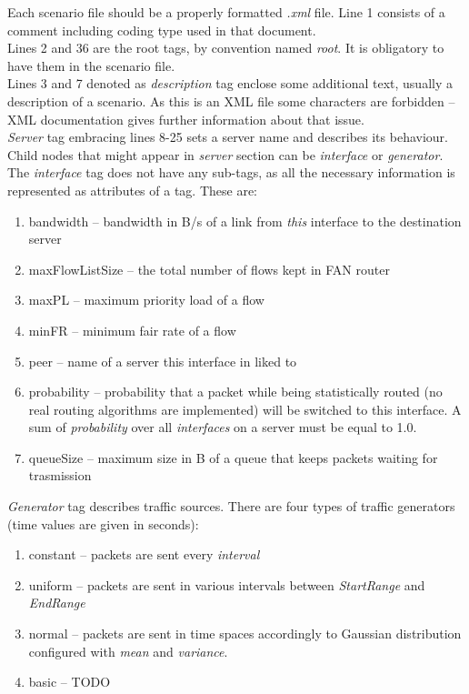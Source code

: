 \documentclass[a4paper,12pt]{article}
\begin{document}
	Each scenario file should be a properly formatted \emph{.xml} file. Line 1
	consists of a comment including coding type used in that document.\\
	Lines 2 and 36 are the root tags, by convention named \emph{root}. It is
	obligatory to have them in the scenario file.\\
	Lines 3 and 7 denoted as \emph{description} tag enclose some
	additional text, usually a description of a scenario. As this is an XML file
	some characters are forbidden -- XML documentation gives further
	information about that issue.\\
	\emph{Server} tag embracing lines 8-25 sets a server name and describes its
	behaviour. Child nodes that might appear in \emph{server} section can be
	\emph{interface} or \emph{generator}.\\
	The \emph{interface} tag does not have any sub-tags, as all the necessary
	information is represented as attributes of a tag. These are:
	\begin{enumerate}
      \item bandwidth -- bandwidth in B/s of a link from \emph{this} interface
      to the destination server
      \item maxFlowListSize -- the total number of flows kept in FAN router
      \item maxPL -- maximum priority load of a flow
      \item minFR -- minimum fair rate of a flow
      \item peer -- name of a server this interface in liked to
      \item probability -- probability that a packet while being
      statistically routed (no real routing algorithms are implemented) will
      be switched to this interface. A sum of \emph{probability} over all
      \emph{interfaces} on a server must be equal to 1.0.
      \item queueSize -- maximum size in B of a queue that keeps packets
      waiting for trasmission
    \end{enumerate}
    \emph{Generator} tag describes traffic sources. There are four types of
    traffic generators (time values are given in seconds):
    \begin{enumerate}
      \item constant -- packets are sent every \emph{interval} 
      \item uniform -- packets are sent in various intervals between
      \emph{StartRange} and \emph{EndRange}
      \item normal -- packets are sent in time spaces accordingly to Gaussian
      distribution configured with \emph{mean} and \emph{variance}. 
      \item basic -- TODO
    \end{enumerate}
\end{document}
